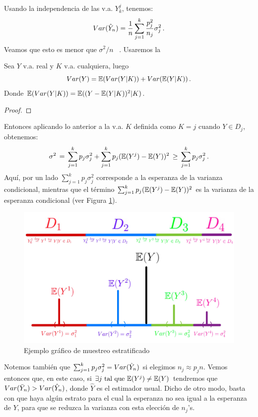 \newline Usando la independencia de las v.a.  $Y_{k}^j$,  tenemos: %
$$ Var(\hat{Y}_n)=\displaystyle\frac{1}{n}\sum^k_{j=1}\frac{p_j^2}{n_j}\sigma^2_j \, .$$
Veamos que esto es menor que $\sigma^2/n$ \, . Usaremos la
\begin{proposition}
Sea $Y$ v.a. real y $K$ v.a. cualquiera, luego
$$ Var(Y)=\mathbb{E}(Var(Y|K))+Var(\mathbb{E}(Y|K)) \, .$$
Donde $\mathbb{E}(Var(Y|K))=\mathbb{E}((Y-\mathbb{E}(Y|K))^2|K)$.
\end{proposition}
\begin{proof}
\ejercicio
\end{proof}
Entonces aplicando lo anterior a  la v.a. $K$ definida como $K=j$ cuando $Y\in D_j$, obtenemos:
$$ \sigma^2\,=\,\displaystyle\sum^k_{j=1}p_j\sigma^2_j+\sum^k_{j=1}p_j(\mathbb{E}(Y^j)-\mathbb{E}(Y))^2\,\geq \,\sum^k_{j=1}p_j\sigma^2_j \, .$$
Aqu\'i, por un lado $\sum^k_{j=1}p_j\sigma^2_j$ corresponde a la esperanza de la varianza condicional, mientras que el término $\sum^k_{j=1}p_j(\mathbb{E}(Y^j)-\mathbb{E}(Y))^2$ es la varianza de la esperanza condicional (ver Figura \ref{fig:estrat}). 
\begin{figure}
    \centering
    \includegraphics[scale=0.17]{img/clase_09_pag_3.jpg}
    \caption{Ejemplo gráfico de muestreo estratificado}
    \label{fig:estrat}
\end{figure}

\newp Notemos tambi\'en que  $\sum^k_{j=1}p_j\sigma^2_j= Var(\hat{Y}_n)$ si elegimos  $n_j\approx p_jn$.  Vemos entonces que, en este caso,   si $\exists j\mbox{ tal que }\mathbb{E}(Y^j)\neq\mathbb{E}(Y)$ tendremos que $Var(\bar{Y}_n)>Var(\hat{Y}_n)$, donde $\hat{Y}$ es el estimador usual.   Dicho de otro modo, basta con que haya algún estrato para el cual la esperanza no sea igual a la esperanza de $Y$, para que se reduzca la varianza con esta elecci\'on de $n_j$'s.


